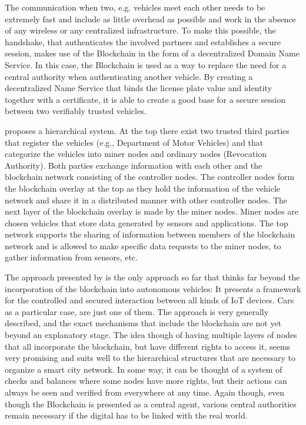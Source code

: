 The communication when two, e.g. vehicles meet each other needs to be extremely fast and include as little overhead as possible and work in the absence of any wireless or any centralized infrastructure. To make this possible, the handshake, that authenticates the involved partners and establishes a secure session, makes use of the Blockchain in the form of a decentralized Domain Name Service.
In this case, the Blockchain is used as a way to replace the need for a central authority when authenticating another vehicle. By creating a decentralized Name Service that binds the license plate value and identity together with a certificate, it is able to create a good base for a secure session between two verifiably trusted vehicles.

\citeauthor{Sharma2017} proposes a hierarchical system. At the top there exist two trusted third parties that register the vehicles (e.g., Department of Motor Vehicles) and that categorize the vehicles into miner nodes and ordinary nodes (Revocation Authority). Both parties exchange information with each other and the blockchain network consisting of the controller nodes. The controller nodes form the blockchain overlay at the top as they hold the information of the vehicle network and share it in a distributed manner with other controller nodes.
The next layer of the blockchain overlay is made by the miner nodes. Miner nodes are chosen vehicles that store data generated by sensors and applications. The top network supports the sharing of information between members of the blockchain network and is allowed to make specific data requests to the miner nodes, to gather information from sensors, etc.

The approach presented by \citeauthor{Sharma2017} is the only approach so far that thinks far beyond the incorporation of the blockchain into autonomous vehicles: It presents a framework for the controlled and secured interaction between all kinds of IoT devices. Cars as a particular case, are just one of them. The approach is very generally described, and the exact mechanisms that include the blockchain are not yet beyond an explanatory stage.
The idea though of having multiple layers of nodes that all incorporate the blockchain, but have different rights to access it, seems very promising and suits well to the hierarchical structures that are necessary to organize a smart city network. In some way, it can be thought of a system of checks and balances where some nodes have more rights, but their actions can always be seen and verified from everywhere at any time.
Again though, even though the Blockchain is presented as a central agent, various central authorities remain necessary if the digital has to be linked with the real world.


